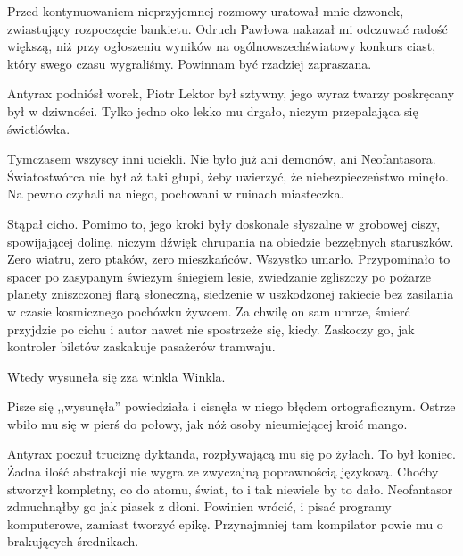 Przed kontynuowaniem nieprzyjemnej rozmowy uratował mnie dzwonek, zwiastujący rozpoczęcie bankietu.
Odruch Pawłowa nakazał mi odczuwać radość większą, niż przy ogłoszeniu wyników na ogólnowszechświatowy konkurs ciast, który swego czasu wygraliśmy. 
Powinnam być rzadziej zapraszana.

\divider{}

Antyrax podniósł worek, Piotr Lektor był sztywny, jego wyraz twarzy poskręcany był w dziwności. 
Tylko jedno oko lekko mu drgało, niczym przepalająca się świetlówka.

Tymczasem wszyscy inni uciekli. Nie było już ani demonów, ani Neofantasora. Światostwórca nie był aż taki głupi, żeby uwierzyć, że niebezpieczeństwo minęło. 
Na pewno czyhali na niego, pochowani w ruinach miasteczka.

Stąpał cicho. Pomimo to, jego kroki były doskonale słyszalne w grobowej ciszy, spowijającej dolinę, niczym dźwięk chrupania na obiedzie bezzębnych staruszków.
Zero wiatru, zero ptaków, zero mieszkańców. Wszystko umarło. 
Przypominało to spacer po zasypanym świeżym śniegiem lesie, 
zwiedzanie zgliszczy po pożarze planety zniszczonej flarą słoneczną, 
siedzenie w uszkodzonej rakiecie bez zasilania w czasie kosmicznego pochówku żywcem.
Za chwilę on sam umrze, śmierć przyjdzie po cichu i autor nawet nie spostrzeże się, kiedy.
Zaskoczy go, jak kontroler biletów zaskakuje pasażerów tramwaju.

Wtedy wysuneła się zza winkla Winkla. 

\begin{dialogue}
\ds{} Pisze się ,,wysunęła'' \dm{} powiedziała i cisnęła w niego błędem ortograficznym. Ostrze wbiło mu się w pierś do połowy, jak nóż osoby nieumiejącej kroić mango.
\end{dialogue}
Antyrax poczuł truciznę dyktanda, rozpływającą mu się po żyłach. To był koniec. Żadna ilość abstrakcji nie wygra ze zwyczajną poprawnością językową.
Choćby stworzył kompletny, co do atomu, świat, to i tak niewiele by to dało. Neofantasor zdmuchnąłby go jak piasek z dłoni.
Powinien wrócić, i pisać programy komputerowe, zamiast tworzyć epikę. Przynajmniej tam kompilator powie mu o brakujących średnikach.

